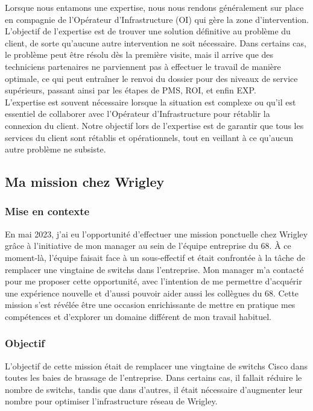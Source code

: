 \documentclass[12pt, a4paper]{article}
\begin{document}
Lorsque nous entamons une expertise, nous nous rendons généralement
sur place en compagnie de l'Opérateur d'Infrastructure (OI) qui gère
la zone d'intervention. L'objectif de l'expertise est de trouver
une solution définitive au problème du client, de sorte qu'aucune
autre intervention ne soit nécessaire. Dans certains cas, le problème
peut être résolu dès la première visite, mais il arrive que des
techniciens partenaires ne parviennent pas à effectuer le travail de
manière optimale, ce qui peut entraîner le renvoi du dossier pour
des niveaux de service supérieurs, passant ainsi par les étapes de
PMS, ROI, et enfin EXP.\\

L'expertise est souvent nécessaire lorsque la situation est complexe
ou qu'il est essentiel de collaborer avec l'Opérateur
d'Infrastructure pour rétablir la connexion du client. Notre objectif
lors de l'expertise est de garantir que tous les services du client
sont rétablis et opérationnels, tout en veillant à ce qu'aucun
autre problème ne subsiste. 

\newpage
\subsection{Ma mission chez Wrigley}
\subsubsection{Mise en contexte}
En mai 2023, j'ai eu l'opportunité d'effectuer une mission
ponctuelle chez Wrigley grâce à l'initiative de mon manager au
sein de l'équipe entreprise du 68. À ce moment-là, l'équipe faisait
face à un sous-effectif et était confrontée à la tâche de remplacer
une vingtaine de switchs dans l'entreprise. Mon manager m'a
contacté pour me proposer cette opportunité, avec l'intention de
me permettre d'acquérir une expérience nouvelle et d'aussi
pouvoir aider aussi les collègues du 68. Cette mission
s'est révélée être une occasion enrichissante de mettre en pratique
mes compétences et d'explorer un domaine différent de mon travail habituel.

\subsubsection{Objectif}
L'objectif de cette mission était
de remplacer une vingtaine de switchs
Cisco dans toutes les baies de brassage de l'entreprise.
Dans certains cas, il fallait
réduire le nombre de switchs, tandis que dans d'autres, il
était nécessaire d'augmenter leur nombre pour optimiser
l'infrastructure réseau de Wrigley.
\end{document}
